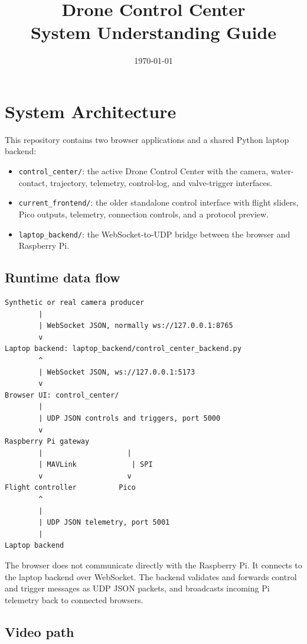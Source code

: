 \documentclass[11pt]{article}
\title{Drone Control Center\\System Understanding Guide}
\author{}
\date{\today}
\begin{document}
\maketitle
\tableofcontents
\newpage

\section{System Architecture}

This repository contains two browser applications and a shared Python laptop
backend:

\begin{itemize}[leftmargin=*]
  \item \texttt{control\_center/}: the active Drone Control Center with the
  camera, water-contact, trajectory, telemetry, control-log, and valve-trigger
  interfaces.
  \item \texttt{current\_frontend/}: the older standalone control interface
  with flight sliders, Pico outputs, telemetry, connection controls, and a
  protocol preview.
  \item \texttt{laptop\_backend/}: the WebSocket-to-UDP bridge between the
  browser and Raspberry Pi.
\end{itemize}

\subsection{Runtime data flow}

\begin{lstlisting}
Synthetic or real camera producer
        |
        | WebSocket JSON, normally ws://127.0.0.1:8765
        v
Laptop backend: laptop_backend/control_center_backend.py
        ^
        | WebSocket JSON, ws://127.0.0.1:5173
        v
Browser UI: control_center/
        |
        | UDP JSON controls and triggers, port 5000
        v
Raspberry Pi gateway
        |                    |
        | MAVLink             | SPI
        v                    v
Flight controller          Pico
        ^
        |
        | UDP JSON telemetry, port 5001
        |
Laptop backend
\end{lstlisting}

The browser does not communicate directly with the Raspberry Pi. It connects
to the laptop backend over WebSocket. The backend validates and forwards
control and trigger messages as UDP JSON packets, and broadcasts incoming Pi
telemetry back to connected browsers.

\subsection{Video path}
\end{document}
